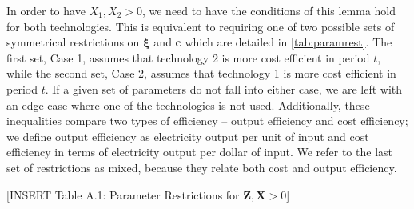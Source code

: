 \documentclass[11pt,a4paper,leqno]{extarticle}
\begin{document}
	In order to have $X_1, X_2 > 0$, we need to have the conditions of this lemma hold for both technologies. This is equivalent to  requiring one of two possible sets of symmetrical restrictions on $\boldsymbol{\xi}$ and $\mathbf{c}$ which are detailed in \autoref{tab:paramrest}. The first set, Case 1, assumes that technology 2 is more cost efficient in period $t$, while the second set, Case 2, assumes that technology 1 is more cost efficient in period $t$. If a given set of parameters do not fall into either case, we are left with an edge case where one of the technologies is not used. Additionally, these inequalities compare two types of efficiency -- output efficiency and cost efficiency; we define output efficiency as electricity output per unit of input and cost efficiency in terms of electricity output per dollar of input. We refer to the last set of restrictions as mixed, because they relate both cost and output efficiency. 


	\vspace{0.15in}
	\begin{center}
		[INSERT Table A.1: Parameter Restrictions for $\mathbf{Z}, \mathbf{X} > 0$]
	\end{center}
	\vspace{0.15in}
	
\end{document}
